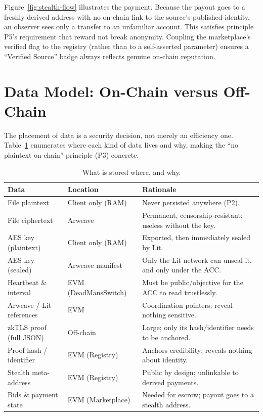 Figure~\ref{fig:stealth-flow} illustrates the payment. Because the payout goes to
a freshly derived address with no on-chain link to the source's published
identity, an observer sees only a transfer to an unfamiliar account. This
satisfies principle P5's requirement that reward not break anonymity. Coupling the
marketplace's verified flag to the registry (rather than to a self-asserted
parameter) ensures a ``Verified Source'' badge always reflects genuine on-chain
reputation.

\section{Data Model: On-Chain versus Off-Chain}
\label{sec:design-datamodel}

The placement of data is a security decision, not merely an efficiency one.
Table~\ref{tab:datamodel} enumerates where each kind of data lives and why,
making the ``no plaintext on-chain'' principle (P3) concrete.

\begin{table}[htbp]
\centering
\caption{What is stored where, and why.}
\label{tab:datamodel}
\small
\begin{tabular}{@{}p{4.4cm}p{3.0cm}p{6.0cm}@{}}
\toprule
\textbf{Data} & \textbf{Location} & \textbf{Rationale} \\
\midrule
File plaintext            & Client only (RAM) & Never persisted anywhere (P2). \\
File ciphertext           & Arweave           & Permanent, censorship-resistant; useless without the key. \\
AES key (plaintext)       & Client only (RAM) & Exported, then immediately sealed by Lit. \\
AES key (sealed)          & Arweave manifest  & Only the Lit network can unseal it, and only under the ACC. \\
Heartbeat \& interval     & EVM (DeadMansSwitch) & Must be public/objective for the ACC to read trustlessly. \\
Arweave / Lit references  & EVM               & Coordination pointers; reveal nothing sensitive. \\
zkTLS proof (full JSON)   & Off-chain         & Large; only its hash/identifier needs to be anchored. \\
Proof hash / identifier   & EVM (Registry)    & Anchors credibility; reveals nothing about identity. \\
Stealth meta-address      & EVM (Registry)    & Public by design; unlinkable to derived payments. \\
Bids \& payment state     & EVM (Marketplace) & Needed for escrow; payout goes to a stealth address. \\
\bottomrule
\end{tabular}
\end{table}

